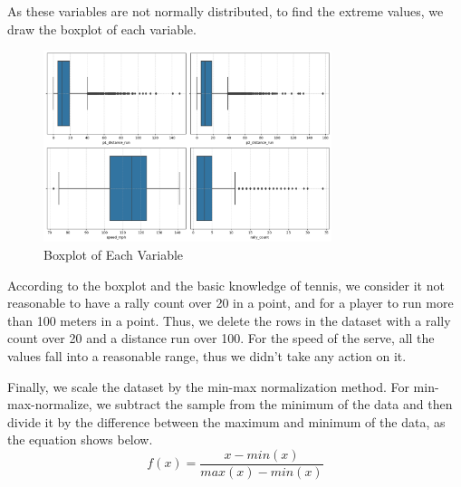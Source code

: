 \documentclass[12pt]{article}
\begin{document}
As these variables are not normally distributed, to find the extreme values, we draw the boxplot of each variable.
\begin{figure}[h!]
    \centering
    \includegraphics[width=0.75\textwidth,height = 0.45\textwidth]{boxplot.png}
    \caption{Boxplot of Each Variable}
    \label{fig:1}
\end{figure}

\pagebreak
According to the boxplot and the basic knowledge of tennis, we consider it not reasonable to have a rally count over 20 in a point, and for a player to run more than 100 meters in a point. 
Thus, we delete the rows in the dataset with a rally count over 20 and a distance run over 100. For the speed of the serve, all the values fall into a reasonable range, thus we didn't take any action on it.

Finally, we scale the dataset by the min-max normalization method. For min-max-normalize, we subtract the sample from the minimum of the data and then divide it by the difference between the maximum and minimum of the data, as the equation shows below.
\begin{equation}
    f(x) = \frac{x-min(x)}{max(x)-min(x)}
\end{equation}
\end{document}
